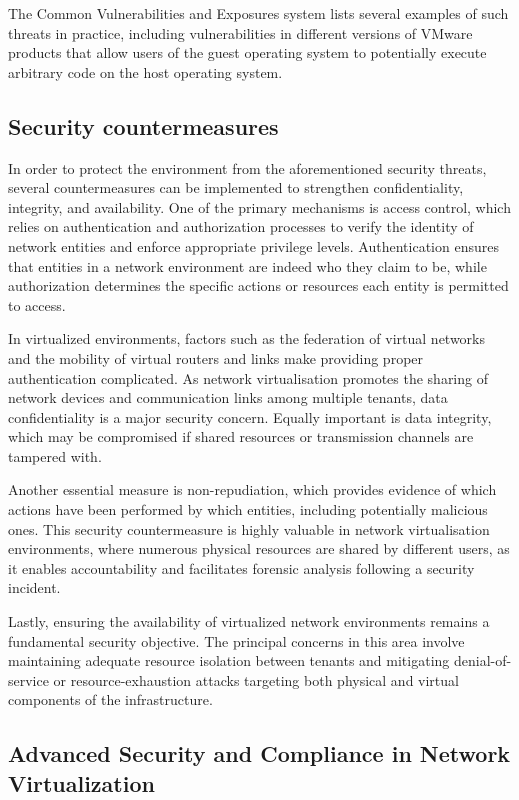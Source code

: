 The Common Vulnerabilities and Exposures system lists several examples of such threats in practice, including vulnerabilities in different versions of VMware products that allow users of the guest operating system to potentially execute arbitrary code on the host operating system.

\subsection{Security countermeasures}

In order to protect the environment from the aforementioned security threats, several countermeasures can be implemented to strengthen confidentiality, integrity, and availability. One of the primary mechanisms is access control, which relies on authentication and authorization processes to verify the identity of network entities and enforce appropriate privilege levels. Authentication ensures that entities in a network environment are indeed who they claim to be, while authorization determines the specific actions or resources each entity is permitted to access. 

In virtualized environments, factors such as the federation of virtual networks and the mobility of virtual routers and links make providing proper authentication complicated. As network virtualisation promotes the sharing of network devices and communication links among multiple tenants, data confidentiality is a major security concern. Equally important is data integrity, which may be compromised if shared resources or transmission channels are tampered with. 

Another essential measure is non-repudiation, which provides evidence of which actions have been performed by which entities, including potentially malicious ones. This security countermeasure is highly valuable in network virtualisation environments, where numerous physical resources are shared by different users, as it enables accountability and facilitates forensic analysis following a security incident. 

Lastly, ensuring the availability of virtualized network environments remains a fundamental security objective. The principal concerns in this area involve maintaining adequate resource isolation between tenants and mitigating denial-of-service or resource-exhaustion attacks targeting both physical and virtual components of the infrastructure.

\subsection{Advanced Security and Compliance in Network Virtualization}

